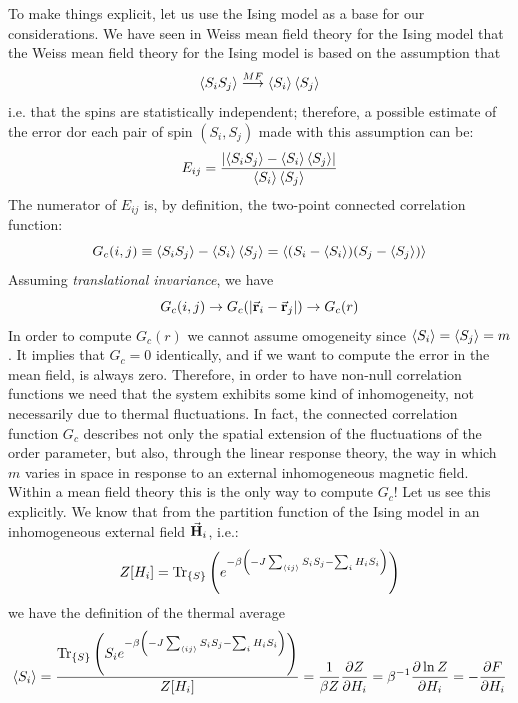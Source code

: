 \documentclass[../main/main.tex]{subfiles}
\begin{document}
To make things explicit, let us use the Ising model as a base for our considerations. We have seen in Weiss mean field theory for the Ising model that the Weiss mean field theory for the Ising model is based on the assumption that
\begin{equation*}
  \expval{S_i S_j} \overset{MF}{\longrightarrow } \expval{S_i} \expval{S_j}
\end{equation*}
 i.e. that the spins are statistically independent; therefore, a possible estimate of the error dor each pair of spin \( (S_i,S_j) \) made with this assumption can be:
\begin{equation}
  E_{ij} = \frac{ \abs{\expval{S_i S_j}  - \expval{S_i} \expval{S_j}}   }{\expval{S_i}\expval{S_j}  }
\end{equation}
The numerator of \(   E_{ij}  \) is, by definition, the two-point connected correlation function:
\begin{equation}
  G_c (i,j) \equiv \expval{S_i S_j} - \expval{S_i} \expval{S_j} = \expval{(S_i -\expval{S_i} )(S_j - \expval{S_j} )}
\end{equation}
Assuming \emph{translational invariance}, we have
\begin{equation*}
  G_c (i,j) \rightarrow G_c \qty(\abs{\va{r}_i - \va{r}_j} ) \rightarrow G_c (r)
\end{equation*}
In order to compute \( G_c (r) \) we cannot assume omogeneity since \( \expval{S_i} = \expval{S_j} = m   \). It implies that \( G_c = 0 \) identically, and if we want to compute the error in the mean field, is always zero. Therefore, in order to have non-null correlation functions we need that the system exhibits some kind of inhomogeneity, not necessarily due to thermal fluctuations. In fact, the connected correlation function \( G_c \)  describes not only the spatial extension of the fluctuations of the order parameter, but also, through the linear response theory, the way in which \( m \) varies in space in response to an external inhomogeneous magnetic field.  Within a mean field theory this is the  only way to compute \( G_c \)! Let us see this explicitly. We know that from the partition function of the Ising model in an inhomogeneous external field \( \va{H}_i \), i.e.:
\begin{equation}
  Z [H_i]= \Tr_{\{ S \} } \qty(e^{-\beta \qty(-J \sum_{\expval{ij} }^{} S_i S_j   - \sum_{i}^{} H_i S_i ) } )
\end{equation}
we have  the definition of the thermal average
\begin{equation}
  \expval{S_i} = \frac{\Tr_{\{ S \} } \qty(S_i e^{-\beta \qty(-J \sum_{\expval{ij} }^{} S_i S_j   - \sum_{i}^{} H_i S_i ) } ) }{Z[H_i]}
  = \frac{1}{\beta Z}  \pdv{Z }{H_i}  = \beta ^{-1} \pdv{\ln{Z} }{H_i}
  = -\pdv{F}{H_i}
\end{equation}
\end{document}

